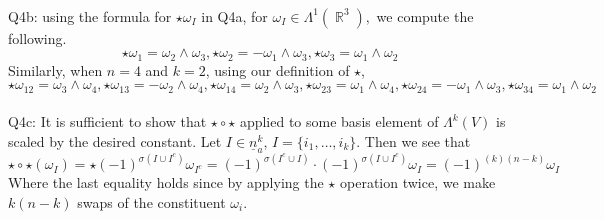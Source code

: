 \documentclass[letterpaper]{article}
\DeclareMathOperator{\R}{\mathbb{R}}
\begin{document}
\newline \\ Q4b: using the formula for $\star \omega_I$ in Q4a, for $\omega_I\in \Lambda^1 (\R^3),$ we compute the following. $$\star \omega_1 = \omega_2\wedge \omega_3, \star \omega_2 = -\omega_1\wedge \omega_3, \star \omega_3 = \omega_1\wedge \omega_2$$
Similarly, when $n=4$ and $k=2$, using our definition of $\star$, 
$$\star \omega_{12} = \omega_3 \wedge \omega_4, \star \omega_{13} = -\omega_2 \wedge \omega_4, \star \omega_{14} =\omega_2 \wedge \omega_3 , \star \omega_{23} = \omega_1 \wedge \omega_4 , \star \omega_{24} =-\omega_1 \wedge \omega_3 , \star\omega_{34} = \omega_1\wedge \omega_2$$
\newline \\ Q4c: It is sufficient to show that $\star \circ \star $ applied to some basis element of $\Lambda^k (V)$ is scaled by the desired constant. 
Let $I\in \underline{n}_a^k$, $I=\{ i_1, \dots ,i_k \} $. Then we see that 
$$\star \circ \star (\omega_I) = \star (-1)^{\sigma(I \cup I^c)} \omega_{I^c} = (-1)^{\sigma(I^c\cup I)} \cdot(-1)^{\sigma(I \cup I^c)} \omega_I = (-1)^{(k)(n-k)}\omega_I$$
Where the last equality holds since by applying the $\star$ operation twice, we make $k(n-k)$ swaps of the constituent $\omega_i$. 
\end{document}
